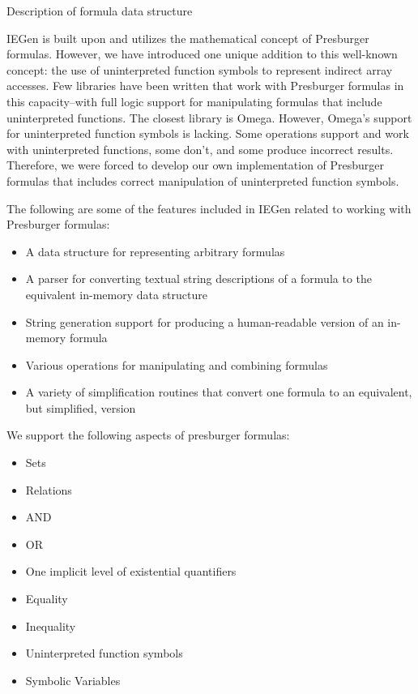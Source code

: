 \documentclass{book}
\begin{document}
\begin{section}{Description of formula data structure}

IEGen is built upon and utilizes the mathematical concept of Presburger formulas.
However, we have introduced one unique addition to this well-known concept: the use of uninterpreted function symbols to represent indirect array accesses.
Few libraries have been written that work with Presburger formulas in this capacity--with full logic support for manipulating formulas that include uninterpreted functions.
The closest library is Omega.
However, Omega's support for uninterpreted function symbols is lacking.
Some operations support and work with uninterpreted functions, some don't, and some produce incorrect results.
Therefore, we were forced to develop our own implementation of Presburger formulas that includes correct manipulation of uninterpreted function symbols.

The following are some of the features included in IEGen related to working with Presburger formulas:

\begin{itemize}
\item A data structure for representing arbitrary formulas
\item A parser for converting textual string descriptions of a formula to the equivalent in-memory data structure
\item String generation support for producing a human-readable version of an in-memory formula
\item Various operations for manipulating and combining formulas
\item A variety of simplification routines that convert one formula to an equivalent, but simplified, version
\end{itemize}

We support the following aspects of presburger formulas:

\begin{itemize}
\item Sets
\item Relations
\item AND
\item OR
\item One implicit level of existential quantifiers
\item Equality
\item Inequality
\item Uninterpreted function symbols
\item Symbolic Variables
\end{itemize}


\end{section}
\end{document}
